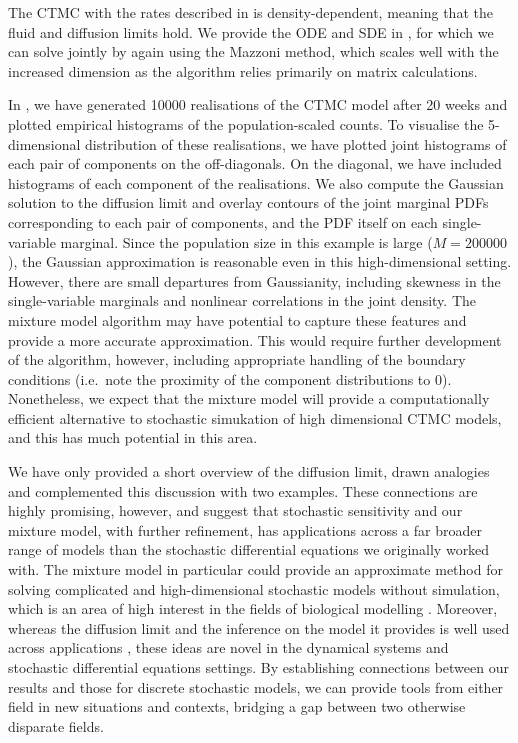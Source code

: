 The CTMC with the rates described in  is density-dependent, meaning that the fluid and diffusion limits hold.
We provide the ODE and SDE in , for which we can solve jointly by again using the Mazzoni method, which scales well with the increased dimension as the algorithm relies primarily on matrix calculations.

In , we have generated 10000 realisations of the CTMC model after 20 weeks and plotted empirical histograms of the population-scaled counts.
To visualise the 5-dimensional distribution of these realisations, we have plotted joint histograms of each pair of components on the off-diagonals. On the diagonal, we have included histograms of each component of the realisations.
We also compute the Gaussian solution to the diffusion limit and overlay contours of the joint marginal PDFs corresponding to each pair of components, and the PDF itself on each single-variable marginal.
Since the population size in this example is large (\(M = 200000\)), the Gaussian approximation is reasonable even in this high-dimensional setting.
However, there are small departures from Gaussianity, including skewness in the single-variable marginals and nonlinear correlations in the joint density.
The mixture model algorithm may have potential to capture these features and provide a more accurate approximation.
This would require further development of the algorithm, however, including appropriate handling of the boundary conditions (i.e.\ note the proximity of the component distributions to \(0\)).
Nonetheless, we expect that the mixture model will provide a computationally efficient alternative to stochastic simukation of high dimensional CTMC models, and this has much potential in this area.

We have only provided a short overview of the diffusion limit, drawn analogies and complemented this discussion with two examples.
These connections are highly promising, however, and suggest that stochastic sensitivity and our mixture model, with further refinement, has applications across a far broader range of models than the stochastic differential equations we originally worked with.
The mixture model in particular could provide an approximate method for solving complicated and high-dimensional stochastic models without simulation, which is an area of high interest in the fields of biological modelling \citehere.
Moreover, whereas the diffusion limit and the inference on the model it provides is well used across applications \citep[e.g.]{PollettEtAl_2010_ModellingPopulationProcesses,Pollett_1990_ModelInterferenceSearching}, these ideas are novel in the dynamical systems and stochastic differential equations
settings.
By establishing connections between our results and those for discrete stochastic models, we can provide tools from either field in new situations and contexts, bridging a gap between two otherwise disparate fields.

